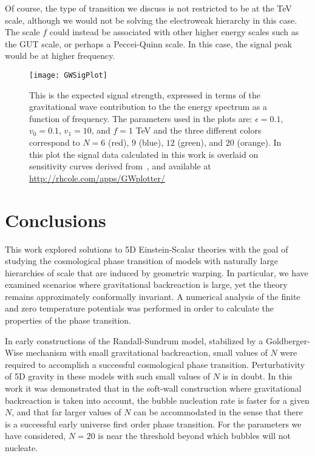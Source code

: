 \documentclass[12pt]{article}
\begin{document}
Of course, the type of transition we discuss is not restricted to be at the TeV scale, although we would not be solving the electroweak hierarchy in this case.  The scale $f$ could instead be associated with other higher energy scales such as the GUT scale, or perhaps a Peccei-Quinn scale.  In this case, the signal peak would be at higher frequency.

\begin{figure}[!htbp]
	\centering
	\texttt{[image: GWSigPlot]}
\caption{This is the expected signal strength, expressed in terms of the gravitational wave contribution to the the energy spectrum as a function of frequency.  The parameters used in the plots are:  $\epsilon = 0.1$, $v_0 = 0.1$, $v_1 = 10$, and $f = 1$ TeV and the three different colors correspond to $N = 6$ (red), $9$ (blue),  $12$ (green), and $20$ (orange).  In this plot the signal data calculated in this work is overlaid on sensitivity curves derived from~\cite{Moore:2014lga}, and available at \url{http://rhcole.com/apps/GWplotter/}}
\label{fig:gwsig}
\end{figure}
  

\section{Conclusions}
This work explored solutions to 5D Einstein-Scalar theories with the goal of studying the cosmological phase transition of models with naturally large hierarchies of scale that are induced by geometric warping.  In particular, we have examined scenarios where gravitational backreaction is large, yet the theory remains approximately conformally invariant.  A numerical analysis of the finite and zero temperature potentials was performed in order to calculate the properties of the phase transition.

In early constructions of the Randall-Sundrum model, stabilized by a Goldberger-Wise mechanism with small gravitational backreaction, small values of $N$ were required to accomplish a successful cosmological phase transition.  Perturbativity of 5D gravity in these models with such small values of $N$ is in doubt.  In this work it was demonstrated that in the soft-wall construction where gravitational backreaction is taken into account, the bubble nucleation rate is faster for a given $N$, and that far larger values of $N$ can be accommodated in the sense that there is a successful early universe first order phase transition.  For the parameters we have considered, $N=20$ is near the threshold beyond which bubbles will not nucleate.
\end{document}
